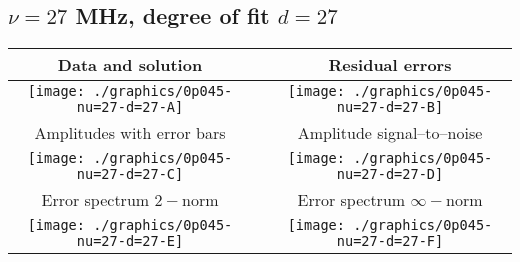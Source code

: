 

% 

\clearpage{}
\break{}

\subsection{$\nu = 27$ MHz, degree of fit $d = 27$}

\begin{table}[h]
    \begin{center}
        \begin{tabular}{ccc}
            Data and solution & \quad & Residual errors \\\hline
            \texttt{[image: ./graphics/0p045-nu=27-d=27-A]} &&
            \texttt{[image: ./graphics/0p045-nu=27-d=27-B]} \\[15pt]
            Amplitudes with error bars && Amplitude signal--to--noise \\\hline
            \texttt{[image: ./graphics/0p045-nu=27-d=27-C]} &&
            \texttt{[image: ./graphics/0p045-nu=27-d=27-D]} \\[15pt]
            Error spectrum $2-$norm && Error spectrum $\infty-$norm \\\hline
            \texttt{[image: ./graphics/0p045-nu=27-d=27-E]} &&
            \texttt{[image: ./graphics/0p045-nu=27-d=27-F]} \\[15pt]
        \end{tabular}
    \end{center}
\label{fig:elev=45, nu=27}
\end{table}



\endinput
